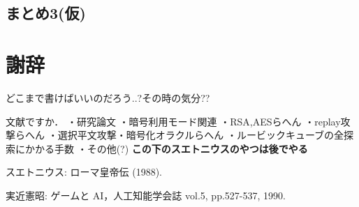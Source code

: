 \documentclass{jsarticle}
\begin{document}
\subsection{まとめ3(仮)}
\section{謝辞}
どこまで書けばいいのだろう..?その時の気分??

\newpage 
文献ですか．
・研究論文
・暗号利用モード関連
・RSA,AESらへん
・replay攻撃らへん
・選択平文攻撃・暗号化オラクルらへん
・ルービックキューブの全探索にかかる手数
・その他(?)
\LARGE
\bf{この下のスエトニウスのやつは後でやる\\}
\normalsize
\begin{thebibliography}{}

 スエトニウス: ローマ皇帝伝 (1988). 

 実近憲昭: ゲームと AI，人工知能学会誌 vol.5, pp.527-537, 1990.

\end{thebibliography}
\end{document}
